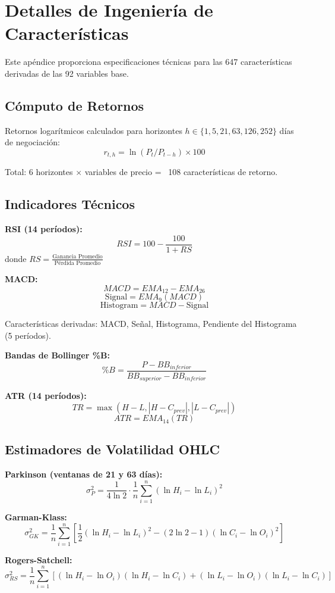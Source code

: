\documentclass[11pt,a4paper]{article}
\begin{document}
\section{Detalles de Ingeniería de Características}

Este apéndice proporciona especificaciones técnicas para las 647 características derivadas de las 92 variables base.

\subsection{Cómputo de Retornos}

Retornos logarítmicos calculados para horizontes $h \in \{1, 5, 21, 63, 126, 252\}$ días de negociación:
$$r_{t,h} = \ln(P_t / P_{t-h}) \times 100$$

Total: 6 horizontes $\times$ variables de precio = ~108 características de retorno.

\subsection{Indicadores Técnicos}

\textbf{RSI (14 períodos):}
$$RSI = 100 - \frac{100}{1 + RS}$$
donde $RS = \frac{\text{Ganancia Promedio}}{\text{Pérdida Promedio}}$

\textbf{MACD:}
$$MACD = EMA_{12} - EMA_{26}$$
$$\text{Signal} = EMA_9(MACD)$$
$$\text{Histogram} = MACD - \text{Signal}$$

Características derivadas: MACD, Señal, Histograma, Pendiente del Histograma (5 períodos).

\textbf{Bandas de Bollinger \%B:}
$$\%B = \frac{P - BB_{inferior}}{BB_{superior} - BB_{inferior}}$$

\textbf{ATR (14 períodos):}
$$TR = \max(H-L, |H-C_{prev}|, |L-C_{prev}|)$$
$$ATR = EMA_{14}(TR)$$

\subsection{Estimadores de Volatilidad OHLC}

\textbf{Parkinson (ventanas de 21 y 63 días):}
$$\sigma_P^2 = \frac{1}{4\ln 2} \cdot \frac{1}{n}\sum_{i=1}^{n}(\ln H_i - \ln L_i)^2$$

\textbf{Garman-Klass:}
$$\sigma_{GK}^2 = \frac{1}{n}\sum_{i=1}^{n}\left[\frac{1}{2}(\ln H_i - \ln L_i)^2 - (2\ln 2-1)(\ln C_i - \ln O_i)^2\right]$$

\textbf{Rogers-Satchell:}
$$\sigma_{RS}^2 = \frac{1}{n}\sum_{i=1}^{n}\left[(\ln H_i - \ln O_i)(\ln H_i - \ln C_i) + (\ln L_i - \ln O_i)(\ln L_i - \ln C_i)\right]$$
\end{document}
